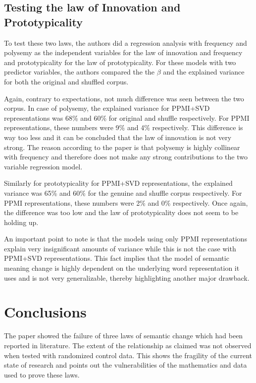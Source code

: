 \documentclass[a0,landscape]{a0poster}
\begin{document}
\begin{multicols}{4}
\subsection*{Testing the law of Innovation and Prototypicality}
To test these two laws, the authors did a regression analysis with frequency and polysemy as the independent variables for the law of innovation and frequency and prototypicality for the law of prototypicality. For these models with two predictor variables, the authors compared the the $\beta$ and the explained variance for both the original and shuffled corpus.

Again, contrary to expectations, not much difference was seen between the two corpus. In case of polysemy, the explained variance for PPMI+SVD representations was 68\% and 60\% for original and shuffle respectively. For PPMI representations, these numbers were 9\% and 4\% respectively. This difference is way too less and it can be concluded that the law of innovation is not very strong. The reason according to the paper is that polysemy is highly collinear with frequency and therefore does not make any strong contributions to the two variable regression model.

Similarly for prototypicality for PPMI+SVD representations, the explained variance was 65\% and 60\% for the genuine and shuffle corpus respectively. For PPMI representations, these numbers were 2\% and 0\% respectively. Once again, the difference was too low and the law of prototypicality does not seem to be holding up.

An important point to note is that the models using only PPMI representations explain very insignificant amounts of variance while this is not the case with PPMI+SVD representations. This fact implies that the model of semantic meaning change is highly dependent on the underlying word representation it uses and is not very generalizable, thereby highlighting another major drawback.


\color{SaddleBrown} %

\section*{Conclusions}
The paper showed the failure of three laws of semantic change which had been reported in literature. The extent of the relationship as claimed was not observed when tested with randomized control data. This shows the fragility of the current state of research and points out the vulnerabilities of the mathematics and data used to prove these laws.


\end{multicols}
\end{document}
